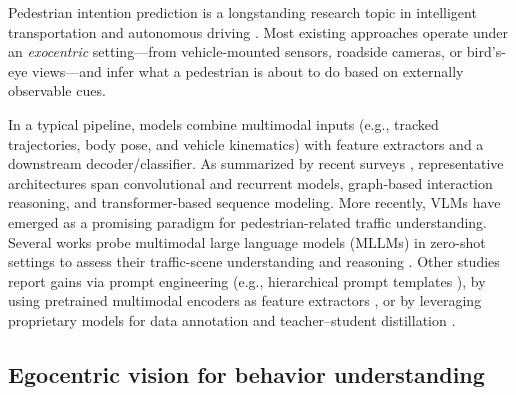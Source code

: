 \documentclass[letterpaper, 10pt, journal]{IEEEtran}  %
\begin{document}
Pedestrian intention prediction is a longstanding research topic in intelligent transportation and autonomous driving \cite{sharma2022pedestrian}. Most existing approaches operate under an \emph{exocentric} setting---from vehicle-mounted sensors, roadside cameras, or bird's-eye views---and infer what a pedestrian is about to do based on externally observable cues. 

In a typical pipeline, models combine multimodal inputs (e.g., tracked trajectories, body pose, and vehicle kinematics) with feature extractors and a downstream decoder/classifier. As summarized by recent surveys \cite{zhang_pedestrian_2023, landry_predicting_2025}, representative architectures span convolutional and recurrent models, graph-based interaction reasoning, and transformer-based sequence modeling.
More recently, VLMs have emerged as a promising paradigm for pedestrian-related traffic understanding. Several works probe multimodal large language models (MLLMs) in zero-shot settings to assess their traffic-scene understanding and reasoning \cite{huang_gpt-4v_2024, ham_omnipredict_2024, zambare2025seeing}. Other studies report gains via prompt engineering (e.g., hierarchical prompt templates \cite{azarmi_pedestrian_2025}), by using pretrained multimodal encoders as feature extractors \cite{uziel_optimizing_2025, munir_pedestrian_2025}, or by leveraging proprietary models for data annotation and teacher--student distillation \cite{gao_application_2025, ling2026vlmped}.


\subsection{Egocentric vision for behavior understanding}
\end{document}

